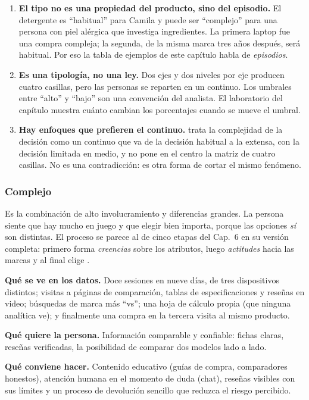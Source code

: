 \begin{enumerate}
  \item \textbf{El tipo no es una propiedad del producto, sino del episodio.} El
  detergente es \enquote{habitual} para Camila y puede ser \enquote{complejo} para
  una persona con piel alérgica que investiga ingredientes. La primera laptop
  fue una compra compleja; la segunda, de la misma marca tres años después, será
  habitual. Por eso la tabla de ejemplos de este capítulo habla de
  \emph{episodios}.
  \item \textbf{Es una tipología, no una ley.} Dos ejes y dos niveles por eje
  producen cuatro casillas, pero las personas se reparten en un continuo. Los
  umbrales entre \enquote{alto} y \enquote{bajo} son una convención del analista.
  El laboratorio del capítulo muestra cuánto cambian los porcentajes cuando se
  mueve el umbral.
  \item \textbf{Hay enfoques que prefieren el continuo.} \textcite{solomon2017}
  trata la complejidad de la decisión como un continuo que va de la decisión
  habitual a la extensa, con la decisión limitada en medio, y no pone en el centro
  la matriz de cuatro casillas. No es una contradicción: es otra forma de cortar
  el mismo fenómeno. 
\end{enumerate}

\subsubsection{Complejo}
\label{sec:cap09-complejo}

Es la combinación de alto involucramiento y diferencias grandes. La persona
siente que hay mucho en juego y que elegir bien importa, porque las opciones
\emph{sí} son distintas. El proceso se parece al de cinco etapas del Cap.~6 en
su versión completa: primero forma \emph{creencias} sobre los atributos, luego
\emph{actitudes} hacia las marcas y al final elige \parencite{assael1987}.

\begin{cajaEjemplo}[title={Ejemplo digital: la laptop de Camila}]
\textbf{Qué se ve en los datos.} Doce sesiones en nueve días, de tres
dispositivos distintos; visitas a páginas de comparación, tablas de
especificaciones y reseñas en video; búsquedas de marca más \enquote{vs}; una
hoja de cálculo propia (que ninguna analítica ve); y finalmente una compra en
la tercera visita al mismo producto.

\textbf{Qué quiere la persona.} Información comparable y confiable: fichas claras,
reseñas verificadas, la posibilidad de comparar dos modelos lado a lado.

\textbf{Qué conviene hacer.} Contenido educativo (guías de compra, comparadores
honestos), atención humana en el momento de duda (chat), reseñas visibles con
sus límites y un proceso de devolución sencillo que reduzca el riesgo percibido.
\end{cajaEjemplo}

